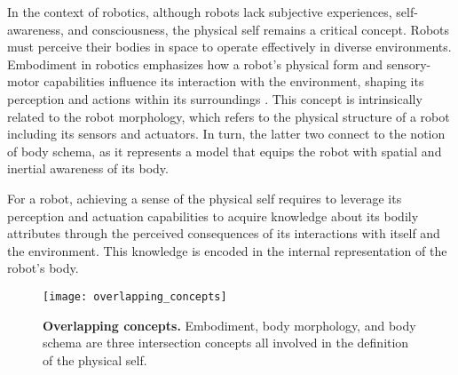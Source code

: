 In the context of robotics, although robots lack subjective experiences, self-awareness, and consciousness, the physical self remains a critical concept. Robots must perceive their bodies in space to operate effectively in diverse environments. %
Embodiment in robotics emphasizes how a robot's physical form and sensory-motor capabilities influence its interaction with the environment, shaping its perception and actions within its surroundings \cite{Wainer2006rolephysicalembodiment}. This concept is intrinsically related to the robot morphology, which refers to the physical structure of a robot including its sensors and actuators. In turn, the latter two connect to the notion of body schema, as it represents a model that equips the robot with spatial and inertial awareness of its body.

For a robot, achieving a sense of the physical self requires to leverage its perception and actuation capabilities to acquire knowledge about its bodily attributes through the perceived consequences of its interactions with itself and the environment. This knowledge is encoded in the internal representation of the robot's body.


\begin{figure}
	\begin{center}
		\texttt{[image: overlapping\_concepts]}
		\caption{\textbf{Overlapping concepts.} Embodiment, body morphology, and body schema are three intersection concepts all involved in the definition of the physical self.}
		\label{fig:overlapping_concepts}
	\end{center}
\end{figure}


